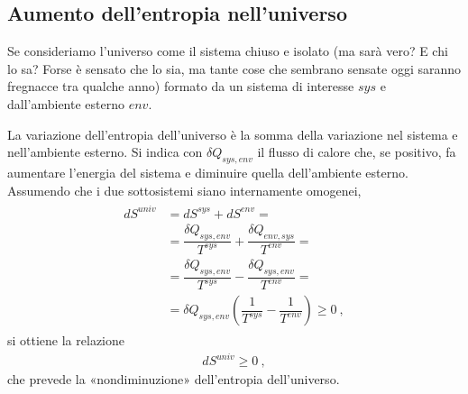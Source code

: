 \documentclass[letterpaper,10pt,italian]{jupyterBook}
\begin{document}
\subsection{Aumento dell’entropia nell’universo}
\label{\detokenize{ch/thermodynamics/principles-second:aumento-dell-entropia-nell-universo}}\label{\detokenize{ch/thermodynamics/principles-second:physics-hs-thermodynamics-principles-second-universe}}
\sphinxAtStartPar
Se consideriamo l’universo come il sistema chiuso e isolato (ma sarà vero? E chi lo sa? Forse è sensato che lo sia, ma tante cose che sembrano sensate oggi saranno fregnacce tra qualche anno) formato da un sistema di interesse \(sys\) e dall’ambiente esterno \(env\).

\sphinxAtStartPar
La variazione dell’entropia dell’universo è la somma della variazione nel sistema e nell’ambiente esterno. Si indica con \(\delta Q_{sys,env}\) il flusso di calore che, se positivo, fa aumentare l’energia del sistema e diminuire quella dell’ambiente esterno. Assumendo che i due sotto\sphinxhyphen{}sistemi siano internamente omogenei,
\begin{equation*}
\begin{split}\begin{aligned}
d S^{univ} & = d S^{sys} + d S^{env} = \\
           & = \dfrac{\delta Q_{sys,env}}{T^{sys}} + \dfrac{\delta Q_{env,sys}}{T^{env}} = \\
           & = \dfrac{\delta Q_{sys,env}}{T^{sys}} - \dfrac{\delta Q_{sys,env}}{T^{env}} = \\
           & = \delta Q_{sys,env} \left( \dfrac{1}{T^{sys}} - \dfrac{1}{T^{env}} \right) \ge 0 \ ,
\end{aligned}\end{split}
\end{equation*}
\sphinxAtStartPar
si ottiene la relazione
\begin{equation*}
\begin{split}dS^{univ} \ge 0 \ ,\end{split}
\end{equation*}
\sphinxAtStartPar
che prevede la «non\sphinxhyphen{}diminuzione» dell’entropia dell’universo.

\sphinxstepscope
\end{document}
